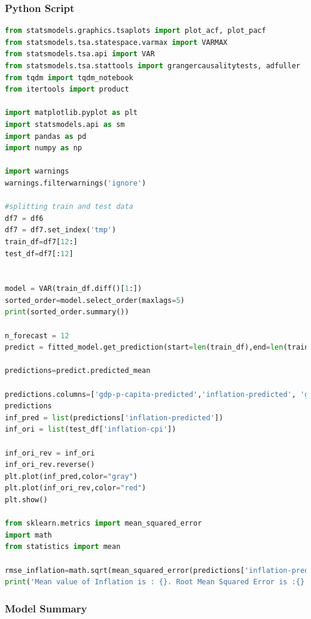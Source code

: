 \subsubsection{Python Script} 
\begin{lstlisting}[language=Python]
from statsmodels.graphics.tsaplots import plot_acf, plot_pacf
from statsmodels.tsa.statespace.varmax import VARMAX
from statsmodels.tsa.api import VAR
from statsmodels.tsa.stattools import grangercausalitytests, adfuller
from tqdm import tqdm_notebook
from itertools import product

import matplotlib.pyplot as plt
import statsmodels.api as sm
import pandas as pd
import numpy as np

import warnings
warnings.filterwarnings('ignore')

#splitting train and test data
df7 = df6
df7 = df7.set_index('tmp')
train_df=df7[12:]
test_df=df7[:12]


model = VAR(train_df.diff()[1:])
sorted_order=model.select_order(maxlags=5)
print(sorted_order.summary())

n_forecast = 12
predict = fitted_model.get_prediction(start=len(train_df),end=len(train_df) + n_forecast-1)#start="1989-07-01",end='1999-01-01')

predictions=predict.predicted_mean

predictions.columns=['gdp-p-capita-predicted','inflation-predicted', 'gdp-growth-predicted','unemp-total-predicted','p-remittances-predicted']
predictions
inf_pred = list(predictions['inflation-predicted'])
inf_ori = list(test_df['inflation-cpi'])

inf_ori_rev = inf_ori
inf_ori_rev.reverse()
plt.plot(inf_pred,color="gray")
plt.plot(inf_ori_rev,color="red")
plt.show()

from sklearn.metrics import mean_squared_error
import math 
from statistics import mean

rmse_inflation=math.sqrt(mean_squared_error(predictions['inflation-predicted'],test_df['inflation-cpi']))
print('Mean value of Inflation is : {}. Root Mean Squared Error is :{}'.format(mean(test_df['inflation-cpi']),rmse_inflation))

\end{lstlisting}

\subsubsection{Model Summary} 

